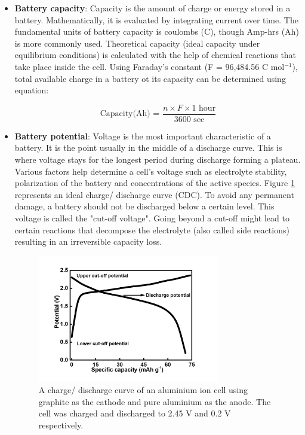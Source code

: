 \begin{itemize}
\item \textbf{Battery capacity}: Capacity is the amount of charge or energy stored in a battery. Mathematically, it is evaluated by integrating current over time. The fundamental units of battery capacity is coulombs (C), though Amp-hrs (Ah) is more commonly used.  Theoretical capacity (ideal capacity under equilibrium conditions) is calculated with the help of chemical reactions that take place inside the cell. Using Faraday’s constant (F = 96,484.56 C mol$^{-1}$), total available charge in a battery ot its capacity can be determined using equation:

\begin{equation} \label{eq1}
  \text{Capacity(Ah) = } \frac{n \times F \times 1 \text{ hour}}{3600 \text{ sec}}
\end{equation}

\item \textbf{Battery potential}: Voltage is the  most important characteristic of a battery. It is the point usually in the middle of a discharge curve. This is where voltage stays for the longest period during discharge forming a plateau. Various factors help determine a cell's voltage such as electrolyte stability, polarization of the battery and concentrations of the active species. Figure \ref{Figures/chap1fig:CDCforcellvoltage} represents an ideal charge/ discharge curve (CDC). To avoid any permanent damage, a battery should not be discharged below a certain level. This voltage is called the "cut-off voltage". Going beyond a cut-off might lead to certain reactions that decompose the electrolyte (also called side reactions) resulting in an irreversible capacity loss. 

\begin{figure}[tbh!]
\centering
\includegraphics[width=0.75\textwidth]{Figures/chap1fig/CDCforcellvoltage}
\caption{A charge/ discharge curve of an aluminium ion cell using graphite as the cathode and pure aluminium as the anode. The cell was charged and discharged to 2.45 V and 0.2 V respectively.}
\label{Figures/chap1fig:CDCforcellvoltage}
\end{figure}


\end{itemize}
